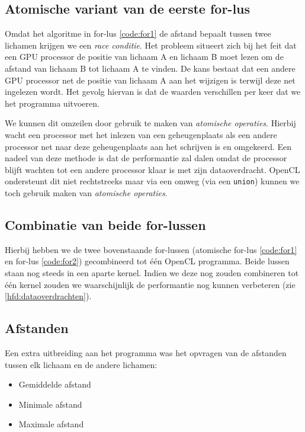 \documentclass{article}
\begin{document}
\subsection{Atomische variant van de eerste for-lus}
Omdat het algoritme in for-lus \ref{code:for1} de afstand bepaalt
tussen twee lichamen krijgen we een \textit{race conditie}. Het probleem situeert
zich bij het feit dat een GPU processor de positie van lichaam A en lichaam B moet
lezen om de afstand van lichaam B tot lichaam A te vinden. De kans bestaat dat een
andere GPU processor net de positie van lichaam A aan het wijzigen is terwijl deze
net ingelezen wordt. Het gevolg hiervan is dat de waarden verschillen per keer dat
we het programma uitvoeren.

We kunnen dit omzeilen door gebruik te maken van \textit{atomische operaties}.
Hierbij wacht een processor met het inlezen van een geheugenplaats als een andere
processor net naar deze geheugenplaats aan het schrijven is en omgekeerd. Een
nadeel van deze methode is dat de performantie zal dalen omdat de processor blijft
wachten tot een andere processor klaar is met zijn dataoverdracht. OpenCL ondersteunt
dit niet rechtstreeks maar via een omweg (via een \texttt{union}) kunnen we toch
gebruik maken van \textit{atomische operaties}.

\subsection{Combinatie van beide for-lussen}
\label{hfd:combinatie-lussen}
Hierbij hebben we de twee bovenstaande for-lussen (atomische for-lus \ref{code:for1} en for-lus \ref{code:for2}) gecombineerd tot \'{e}\'{e}n
OpenCL programma. Beide lussen staan nog steeds in een aparte kernel. Indien we
deze nog zouden combineren tot \'{e}\'{e}n kernel zouden we waarschijnlijk de
performantie nog kunnen verbeteren (zie \ref{hfd:dataoverdrachten}).

\subsection{Afstanden}
Een extra uitbreiding aan het programma was het opvragen van de afstanden tussen
elk lichaam en de andere lichamen:

\begin{itemize}
    \item Gemiddelde afstand
    \item Minimale afstand
    \item Maximale afstand
\end{itemize}
\end{document}
